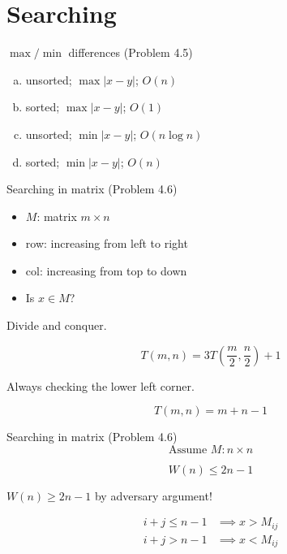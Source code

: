 \section{Searching}

\begin{frame}{$\max/\min$ differences (Problem 4.5)}
  \begin{enumerate}[(a)]
	\item unsorted; $\max |x - y|$; $O(n)$
	\item sorted; $\max |x - y|$; $O(1)$
	\item unsorted; $\min |x - y|$; $O(n \log n)$
	\item sorted; $\min |x - y|$; $O(n)$
  \end{enumerate}
\end{frame}
\begin{frame}{Searching in matrix (Problem 4.6)}
  \begin{itemize}
	\item $M$: matrix $m \times n$
	\item row: increasing from left to right
	\item col: increasing from top to down
	\item Is $x \in M$?
  \end{itemize}

  \pause
  \centerline{Divide and conquer.}

  \pause
  \[
	T(m,n) = 3T(\frac{m}{2}, \frac{n}{2}) + 1 
  \]


  \pause
  \centerline{Always checking the lower left corner.}

  \pause
  \[
	T(m, n) = m + n - 1
  \]
\end{frame}
\begin{frame}{Searching in matrix (Problem 4.6)}
  \[
	\text{Assume } M: n \times n 
  \]

  \[
	W(n) \le 2n - 1
  \]

  \pause
  \vspace{0.30cm}
  \centerline{$W(n) \ge 2n - 1$ by adversary argument!}

  \pause
  \begin{align*}
	i + j \le n - 1 &\implies x > M_{ij} \\
	i + j > n - 1 &\implies x < M_{ij} \\
  \end{align*}
\end{frame}
